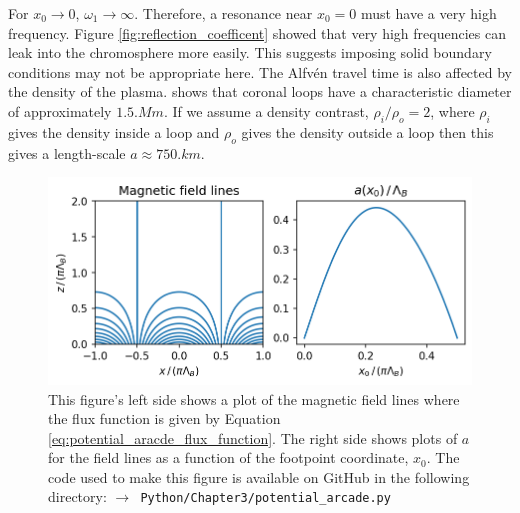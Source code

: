 For $x_0\rightarrow0$, $\omega_1\rightarrow\infty$. Therefore, a resonance near $x_0=0$ must have a very high frequency. Figure \ref{fig:reflection_coefficent} showed that very high frequencies can leak into the chromosphere more easily. This suggests imposing solid boundary conditions may not be appropriate here.
The Alfv\'en travel time is also affected by the density of the plasma. \citet{Klimchuk2015} shows that coronal loops have a characteristic diameter of approximately $1.5\si{.Mm}$. If we assume a density contrast, $\rho_i/\rho_o=2$, \citep{Hood2013,Pascoe2013} where $\rho_i$ gives the density inside a loop and $\rho_o$ gives the density outside a loop then this gives a length-scale $a\approx750\si{.km}$.

\begin{figure}
    \centering
    \vspace{-20pt}
    \includegraphics[width=\textwidth,height=0.8\textheight,keepaspectratio]{figures/chapter03/potential_arcade.png}
    \vspace{-30pt}
    \caption{This figure's left side shows a plot of the magnetic field lines where the flux function is given by Equation \eqref{eq:potential_aracde_flux_function}. The right side shows plots of $a$ for the field lines as a function of the footpoint coordinate, $x_0$. The code used to make this figure is available on GitHub in the following directory:\newline
    \texttt{$\rightarrow$ Python/Chapter3/potential\_arcade.py}}
    \vspace{-10pt}
    \label{fig:potential_arcade}
\end{figure}

